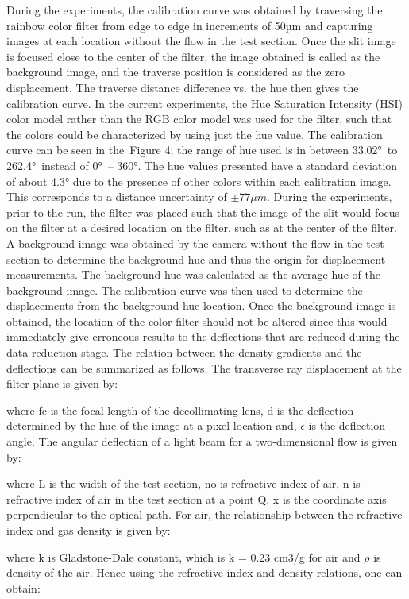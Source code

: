 \documentclass{article}
\begin{document}
During the experiments, the calibration curve was obtained by traversing the rainbow color filter from edge to edge in increments of 50µm and capturing images at each location without the flow in the test section. Once the slit image is focused close to the center of the filter, the image obtained is called as the background image, and the traverse position is considered as the zero displacement. The traverse distance difference vs. the hue then gives the calibration curve. In the current experiments, the Hue Saturation Intensity (HSI) color model rather than the RGB color model was used for the filter, such that the colors could be characterized by using just the hue value. The calibration curve can be seen in the Figure 4; the range of hue used is in between 33.02° to 262.4° instead of 0° – 360°. The hue values presented have a standard deviation of about 4.3° due to the presence of other colors within each calibration image. This corresponds to a distance uncertainty of $\pm 77\mu m$.
	During the experiments, prior to the run, the filter was placed such that the image of the slit would focus on the filter at a desired location on the filter, such as at the center of the filter. A background image was obtained by the camera without the flow in the test section to determine the background hue and thus the origin for displacement measurements. The background hue was calculated as the average hue of the background image. The calibration curve was then used to determine the displacements from the background hue location. Once the background image is obtained, the location of the color filter should not be altered since this would immediately give erroneous results to the deflections that are reduced during the data reduction stage.
	The relation between the density gradients and the deflections can be summarized as follows. The transverse ray displacement at the filter plane is given by:

where fc is the focal length of the decollimating lens, d is the deflection determined by the hue of the image at a pixel location and, $\epsilon$ is the deflection angle. The angular deflection of a light beam for a two-dimensional flow is given by:

where L is the width of the test section, no is refractive index of air, n is refractive index of air in the test section at a point Q, x is the coordinate axis perpendicular to the optical path. For air, the relationship between the refractive index and gas density is given by:

where k is Gladstone-Dale constant, which is k = 0.23 cm3/g for air and $\rho$ is density of the air.  Hence using the refractive index and density relations, one can obtain:
\end{document}
